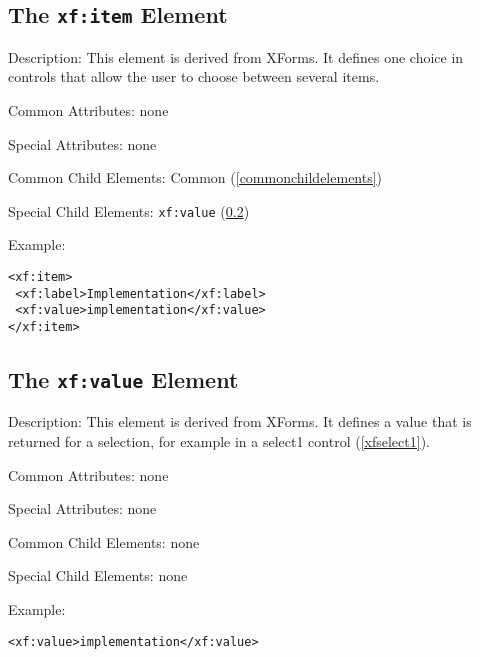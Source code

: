 \subsection{ The \texttt{xf:item} Element}
\label{xfitem}
\begin{description}
 \item Description: This element is derived from XForms. It  defines one choice in controls that allow the user to choose between several items.

 \item Common Attributes: none

 \item Special Attributes: none

 \item Common Child Elements: Common (\ref{commonchildelements})

 \item Special Child Elements: \texttt{xf:value} (\ref{xfvalue})

 \item Example: 

\begin{lstlisting}[caption=\texttt{xf:item} Element]
<xf:item>
 <xf:label>Implementation</xf:label>
 <xf:value>implementation</xf:value>
</xf:item>
\end{lstlisting}
\end{description}





\subsection{ The \texttt{xf:value} Element}
\label{xfvalue}
\begin{description}
 \item Description: This element is derived from XForms. It defines a value that is returned for a selection, for example in a select1 control (\ref{xfselect1}).

 \item Common Attributes: none

 \item Special Attributes: none

 \item Common Child Elements: none

 \item Special Child Elements: none

 \item Example: 

\begin{lstlisting}[caption=\texttt{xf:value} Element]
<xf:value>implementation</xf:value>
\end{lstlisting}
\end{description}




